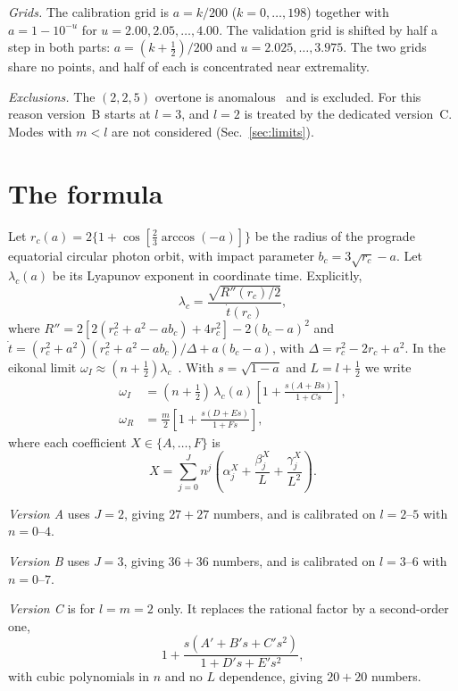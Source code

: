 \documentclass[prd,twocolumn,superscriptaddress,nofootinbib]{revtex4-2}
\begin{document}
\textit{Grids.} The calibration grid is $a=k/200$ ($k=0,\dots,198$) together with $a=1-10^{-u}$ for
$u=2.00,2.05,\dots,4.00$. The validation grid is shifted by half a step in both parts: $a=(k+\tfrac12)/200$ and
$u=2.025,\dots,3.975$. The two grids share no points, and half of each is concentrated near extremality.

\textit{Exclusions.} The $(2,2,5)$ overtone is anomalous~\cite{Cook:2014cta} and is excluded. For this reason
version~B starts at $l=3$, and $l=2$ is treated by the dedicated version~C. Modes with $m<l$ are not considered
(Sec.~\ref{sec:limits}).

\section{The formula}

Let $r_c(a)=2\{1+\cos[\tfrac23\arccos(-a)]\}$ be the radius of the prograde equatorial circular photon orbit, with
impact parameter $b_c=3\sqrt{r_c}-a$. Let $\lambda_c(a)$ be its Lyapunov exponent in coordinate time. Explicitly,
\begin{equation}
\lambda_c=\frac{\sqrt{R''(r_c)/2}}{\dot t(r_c)}, \label{eq:lyap}
\end{equation}
where $R''=2[2(r_c^2+a^2-ab_c)+4r_c^2]-2(b_c-a)^2$ and
$\dot t=(r_c^2+a^2)(r_c^2+a^2-ab_c)/\Delta+a(b_c-a)$, with $\Delta=r_c^2-2r_c+a^2$. In the eikonal limit
$\omega_I\approx(n+\tfrac12)\lambda_c$~\cite{Cardoso:2008bp,Dolan:2010wr}. With $s=\sqrt{1-a}$ and $L=l+\tfrac12$ we
write
\begin{align}
\omega_I &= (n+\tfrac12)\,\lambda_c(a)\left[1+\frac{s(A+Bs)}{1+Cs}\right], \label{eq:wi}\\
\omega_R &= \frac{m}{2}\left[1+\frac{s(D+Es)}{1+Fs}\right], \label{eq:wr}
\end{align}
where each coefficient $X\in\{A,\dots,F\}$ is
\begin{equation}
X=\sum_{j=0}^{J} n^j\left(\alpha_j^X+\frac{\beta_j^X}{L}+\frac{\gamma_j^X}{L^2}\right). \label{eq:coef}
\end{equation}

\textit{Version A} uses $J=2$, giving $27+27$ numbers, and is calibrated on $l=2$--$5$ with $n=0$--$4$.

\textit{Version B} uses $J=3$, giving $36+36$ numbers, and is calibrated on $l=3$--$6$ with $n=0$--$7$.

\textit{Version C} is for $l=m=2$ only. It replaces the rational factor by a second-order one,
\begin{equation}
1+\frac{s(A'+B's+C's^2)}{1+D's+E's^2}, \label{eq:corrC}
\end{equation}
with cubic polynomials in $n$ and no $L$ dependence, giving $20+20$ numbers.
\end{document}
